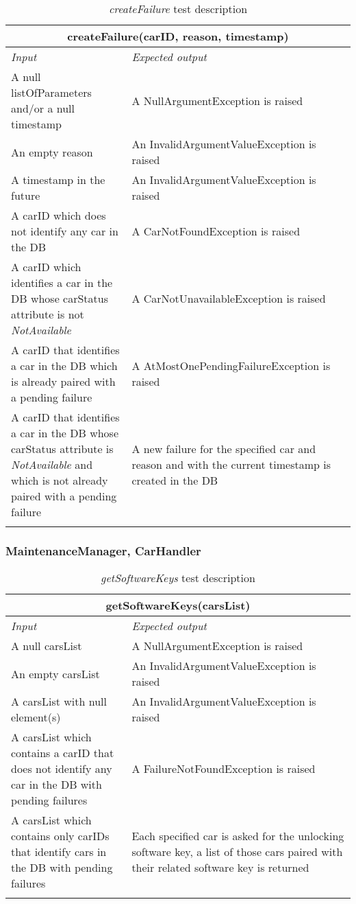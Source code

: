 \begin{longtable}{p{0.35\linewidth}p{0.65\linewidth}}
\multicolumn{2}{c}{\textbf{createFailure(carID, reason, timestamp)}} \\
\toprule
\emph{Input} & \emph{Expected output} \\
\midrule
A null listOfParameters and/or a null timestamp & A NullArgumentException is raised\\
\midrule
An empty reason & An InvalidArgumentValueException is raised \\
\midrule
A timestamp in the future & An InvalidArgumentValueException is raised \\
\midrule
A carID which does not identify any car in the DB & A CarNotFoundException is raised\\
\midrule
A carID which identifies a car in the DB whose carStatus attribute is not \emph{NotAvailable} & A CarNotUnavailableException is raised\\
\midrule
A carID that identifies a car in the DB which is already paired with a pending failure & A AtMostOnePendingFailureException is raised\\
\midrule
A carID that identifies a car in the DB whose carStatus attribute is \emph{NotAvailable} and which is not already paired with a pending failure & A new failure for the specified car and reason and with the current timestamp is created in the DB\\
\bottomrule
\caption{\emph{createFailure} test description}
\end{longtable}

\clearpage

\subsubsection{MaintenanceManager, CarHandler}
\begin{longtable}{p{0.35\linewidth}p{0.65\linewidth}}
\multicolumn{2}{c}{\textbf{getSoftwareKeys(carsList)}} \\
\toprule
\emph{Input} & \emph{Expected output} \\
\midrule
A null carsList & A NullArgumentException is raised\\
\midrule
An empty carsList & An InvalidArgumentValueException is raised \\
\midrule
A carsList with null element(s) & An InvalidArgumentValueException is raised\\
\midrule
A carsList which contains a carID that does not identify any car in the DB with pending failures & A FailureNotFoundException is raised \\
\midrule
A carsList which contains only carIDs that identify cars in the DB with pending failures & Each specified car is asked for the unlocking software key, a list of those cars paired with their related software key is returned\\
\bottomrule
\caption{\emph{getSoftwareKeys} test description}
\end{longtable}


